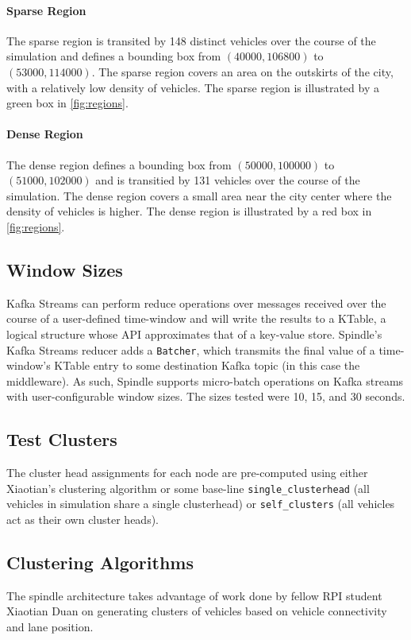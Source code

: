 \documentclass{thesis}
\begin{document}
    \paragraph{Sparse Region}
        The sparse region is transited by 148 distinct vehicles over the course of the simulation and defines a bounding
        box from $(40000, 106800)$ to $(53000, 114000)$. The sparse region covers an area on the outskirts of the city,
        with a relatively low density of vehicles. The sparse region is illustrated by a green box in \ref{fig:regions}.
    \paragraph{Dense Region}
        The dense region defines a bounding box from $(50000, 100000)$ to $(51000, 102000)$ and is transitied by
        131 vehicles over the course of the simulation. The dense region covers a small area near the city center
        where the density of vehicles is higher. The dense region is illustrated by a red box in \ref{fig:regions}.

\subsection{Window Sizes}
    Kafka Streams can perform reduce operations over messages received over the course of a user-defined time-window
    and will write the results to a KTable, a logical structure whose API approximates that of a key-value store. %
    Spindle's Kafka Streams reducer adds a \verb|Batcher|, which transmits the final value of a time-window's KTable
    entry to some destination Kafka topic (in this case the middleware). As such, Spindle supports micro-batch operations
    on Kafka streams with user-configurable window sizes. The sizes tested were 10, 15, and 30 seconds.
\subsection{Test Clusters}
    The cluster head assignments for each node are pre-computed using either Xiaotian's %
    clustering algorithm or some base-line \verb|single_clusterhead| (all vehicles in simulation share a single clusterhead)
    or \verb|self_clusters| (all vehicles act as their own cluster heads).
\subsection{Clustering Algorithms}
    The spindle architecture takes advantage of work done by fellow RPI student Xiaotian Duan on generating
    clusters of vehicles based on vehicle connectivity and lane position. 
\end{document}
